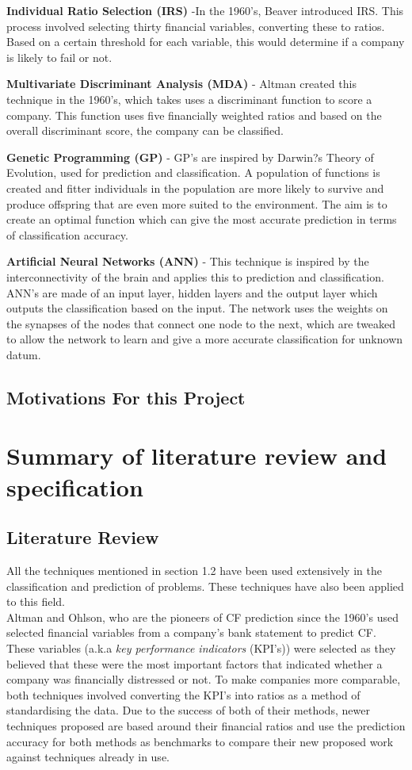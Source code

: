 \documentclass[11pt]{article}
\begin{document}
\textbf{Individual Ratio Selection (IRS)} -In the 1960's, Beaver introduced IRS. This process involved selecting thirty financial variables, converting these to ratios. Based on a certain threshold for each variable, this would determine if a company is likely to fail or not.


\textbf{Multivariate Discriminant Analysis (MDA)} - Altman created this technique in the 1960's, which takes uses a discriminant function to score a company. This function uses five financially weighted ratios and based on the overall discriminant score, the company can be classified. 

\textbf{Genetic Programming (GP)} - GP's are inspired by Darwin?s Theory of Evolution, used for prediction and classification. A population of functions is created and fitter individuals in the population are more likely to survive and produce offspring that are even more suited to the environment. The aim is to create an optimal function which can give the most accurate prediction in terms of classification accuracy. 

\textbf{Artificial Neural Networks (ANN)} - This technique is inspired by the interconnectivity of the brain and applies this to prediction and classification. ANN's are made of an input layer, hidden layers and the output layer which outputs the classification based on the input. The network uses the weights on the synapses of the nodes that connect one node to the next, which are tweaked to allow the network to learn and give a more accurate classification for unknown datum. 

\subsection{Motivations For this Project}
\newpage
\section{Summary of literature review and specification}\label{sec:spec}
\subsection{Literature Review}
All the techniques mentioned in section 1.2 have been used extensively in the classification and prediction of problems. These techniques have also been applied to this field.\\
Altman and Ohlson, who are the pioneers of CF prediction since the 1960's used selected financial variables from a company's bank statement to predict CF. These variables (a.k.a \textit{key performance indicators} (KPI's)) were selected as they believed that these were the most important factors that indicated whether a company was financially distressed or not. To make companies more comparable, both techniques involved converting the KPI's into ratios as a method of standardising the data. Due to the success of both of their methods, newer techniques proposed are based around their financial ratios and use the prediction accuracy for both methods as benchmarks to compare their new proposed work against techniques already in use. \\
\end{document}
